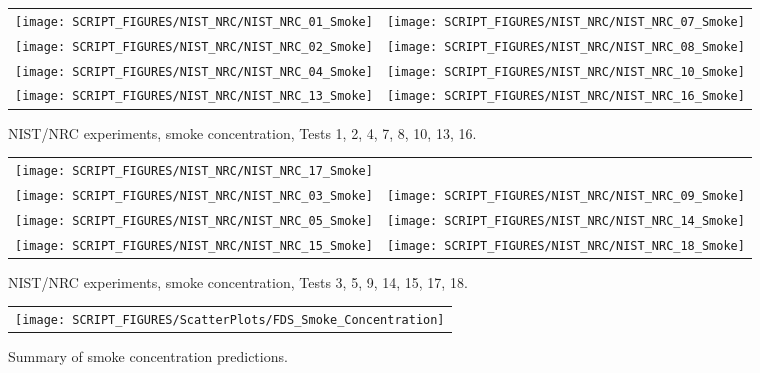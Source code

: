 \begin{figure}[p]
\begin{tabular*}{\textwidth}{l@{\extracolsep{\fill}}r}
\texttt{[image: SCRIPT\_FIGURES/NIST\_NRC/NIST\_NRC\_01\_Smoke]} &
\texttt{[image: SCRIPT\_FIGURES/NIST\_NRC/NIST\_NRC\_07\_Smoke]} \\
\texttt{[image: SCRIPT\_FIGURES/NIST\_NRC/NIST\_NRC\_02\_Smoke]} &
\texttt{[image: SCRIPT\_FIGURES/NIST\_NRC/NIST\_NRC\_08\_Smoke]} \\
\texttt{[image: SCRIPT\_FIGURES/NIST\_NRC/NIST\_NRC\_04\_Smoke]} &
\texttt{[image: SCRIPT\_FIGURES/NIST\_NRC/NIST\_NRC\_10\_Smoke]} \\
\texttt{[image: SCRIPT\_FIGURES/NIST\_NRC/NIST\_NRC\_13\_Smoke]} &
\texttt{[image: SCRIPT\_FIGURES/NIST\_NRC/NIST\_NRC\_16\_Smoke]}
\end{tabular*}
\caption{NIST/NRC experiments, smoke concentration, Tests 1, 2, 4, 7, 8, 10, 13, 16.}
\end{figure}

\begin{figure}[p]
\begin{tabular*}{\textwidth}{l@{\extracolsep{\fill}}r}
\texttt{[image: SCRIPT\_FIGURES/NIST\_NRC/NIST\_NRC\_17\_Smoke]} &
 \\
\texttt{[image: SCRIPT\_FIGURES/NIST\_NRC/NIST\_NRC\_03\_Smoke]} &
\texttt{[image: SCRIPT\_FIGURES/NIST\_NRC/NIST\_NRC\_09\_Smoke]} \\
\texttt{[image: SCRIPT\_FIGURES/NIST\_NRC/NIST\_NRC\_05\_Smoke]} &
\texttt{[image: SCRIPT\_FIGURES/NIST\_NRC/NIST\_NRC\_14\_Smoke]} \\
\texttt{[image: SCRIPT\_FIGURES/NIST\_NRC/NIST\_NRC\_15\_Smoke]} &
\texttt{[image: SCRIPT\_FIGURES/NIST\_NRC/NIST\_NRC\_18\_Smoke]}
\end{tabular*}
\caption{NIST/NRC experiments, smoke concentration, Tests 3, 5, 9, 14, 15, 17, 18.}
\end{figure}


\begin{figure}[p]
\begin{center}
\begin{tabular}{c}
\texttt{[image: SCRIPT\_FIGURES/ScatterPlots/FDS\_Smoke\_Concentration]}
\end{tabular}
\end{center}
\caption[Summary of smoke concentration predictions]{Summary of smoke concentration predictions.}
\end{figure}

